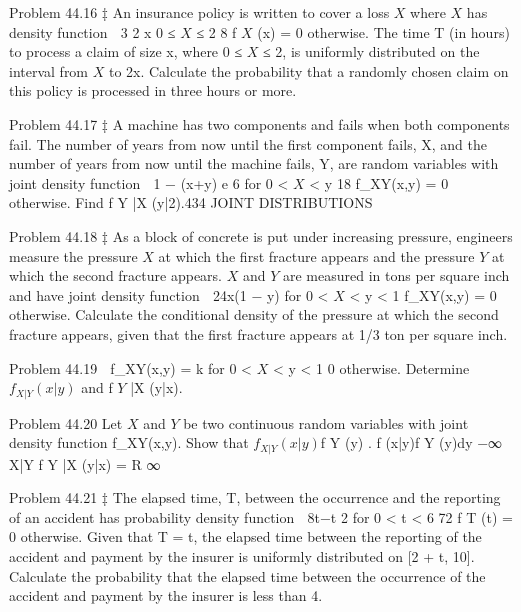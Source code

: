 Problem 44.16 ‡
An insurance policy is written to cover a loss $X$ where $X$ has density function
 3 2
x 0 ≤ $X$ ≤ 2
8
f $X$ (x) =
0 otherwise.
The time T (in hours) to process a claim of size x, where 0 ≤ $X$ ≤ 2, is
uniformly distributed on the interval from $X$ to 2x.
Calculate the probability that a randomly chosen claim on this policy is
processed in three hours or more.



Problem 44.17 ‡
A machine has two components and fails when both components fail. The
number of years from now until the first component fails, X, and the number
of years from now until the machine fails, Y, are random variables with joint
density function

1 − (x+y)
e 6
for 0 < $X$ < y
18
f_{XY}(x,y) =
0
otherwise.
Find f Y |X (y|2).434
JOINT DISTRIBUTIONS



Problem 44.18 ‡
As a block of concrete is put under increasing pressure, engineers measure the
pressure $X$ at which the first fracture appears and the pressure $Y$ at which
the second fracture appears. $X$ and $Y$ are measured in tons per square inch
and have joint density function

24x(1 − y) for 0 < $X$ < y < 1
f_{XY}(x,y) =
0
otherwise.
Calculate the conditional density of the pressure at which the second fracture
appears, given that the first fracture appears at 1/3 ton per square inch.


Problem 44.19

f_{XY}(x,y) =
k for 0 < $X$ < y < 1
0
otherwise.
Determine $f_{X|Y}(x|y)$ and f $Y$ |X (y|x).


Problem 44.20
Let $X$ and $Y$ be two continuous random variables with joint density function
f_{XY}(x,y). Show that
$f_{X|Y}(x|y)$f Y (y)
.
f (x|y)f Y (y)dy
−∞ X|Y
f Y |X (y|x) = R ∞


Problem 44.21 ‡
The elapsed time, T, between the occurrence and the reporting of an accident
has probability density function
 8t−t 2
for 0 < t < 6
72
f T (t) =
0
otherwise.
Given that T = t, the elapsed time between the reporting of the accident
and payment by the insurer is uniformly distributed on [2 + t, 10].
Calculate the probability that the elapsed time between the occurrence of
the accident and payment by the insurer is less than 4.